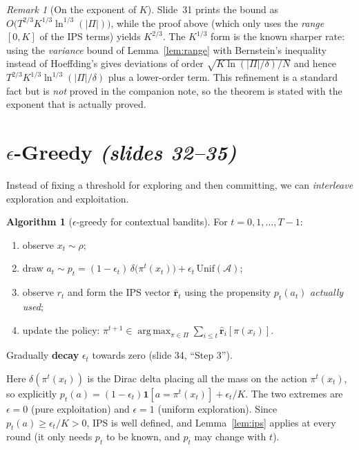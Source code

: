 \documentclass[11pt,a4paper]{article}
\newcommand{\Unif}{\mathrm{Unif}}
\newcommand{\ind}{\mathbf{1}}
\newcommand{\rh}{\hat{\mathbf{r}}}
\newcommand{\calA}{\mathcal{A}}
\DeclareMathOperator*{\argmax}{arg\,max}
\newcommand{\slides}[1]{\emph{(slides #1)}}
\theoremstyle{plain}
\theoremstyle{definition}
\newtheorem{algorithm}[theorem]{Algorithm}
\theoremstyle{remark}
\newtheorem*{remark}{Remark}
\begin{document}
\begin{remark}[On the exponent of $K$]
Slide~31 prints the bound as $O\bigl(T^{2/3}K^{1/3}\ln^{1/3}(|\Pi|)\bigr)$, while the proof above (which only uses the \emph{range} $[0,K]$ of the IPS terms) yields $K^{2/3}$.
The $K^{1/3}$ form is the known sharper rate: using the \emph{variance} bound of Lemma~\ref{lem:range} with Bernstein's inequality instead of Hoeffding's gives
deviations of order $\sqrt{K\ln(|\Pi|/\delta)/N}$ and hence $T^{2/3}K^{1/3}\ln^{1/3}(|\Pi|/\delta)$ plus a lower-order term. This refinement is a standard fact but is
\emph{not} proved in the companion note, so the theorem is stated with the exponent that is actually proved.
\end{remark}
\section{\texorpdfstring{$\epsilon$}{epsilon}-Greedy \slides{32--35}}

Instead of fixing a threshold for exploring and then committing, we can \emph{interleave} exploration and exploitation.

\begin{algorithm}[$\epsilon$-greedy for contextual bandits]\label{alg:eg}
For $t=0,1,\dots,T-1$:
\begin{enumerate}
 \item observe $x_t\sim\rho$;
 \item draw $a_t\sim p_t=(1-\epsilon_t)\,\delta\bigl(\pi^t(x_t)\bigr)+\epsilon_t\,\Unif(\calA)$;
 \item observe $r_t$ and form the IPS vector $\rh_t$ using the propensity $p_t(a_t)$ \emph{actually used};
 \item update the policy: $\pi^{t+1}\in\argmax_{\pi\in\Pi}\sum_{i\le t}\rh_i[\pi(x_i)]$.
\end{enumerate}
Gradually \textbf{decay} $\epsilon_t$ towards zero (slide 34, ``Step 3'').
\end{algorithm}

Here $\delta(\pi^t(x_t))$ is the Dirac delta placing all the mass on the action $\pi^t(x_t)$, so explicitly
$p_t(a)=(1-\epsilon_t)\ind[a=\pi^t(x_t)]+\epsilon_t/K$. The two extremes are $\epsilon=0$ (pure exploitation) and $\epsilon=1$ (uniform exploration).
Since $p_t(a)\ge\epsilon_t/K>0$, IPS is well defined, and Lemma~\ref{lem:ips} applies at every round (it only needs $p_t$ to be known, and $p_t$ may change with $t$).
\end{document}
